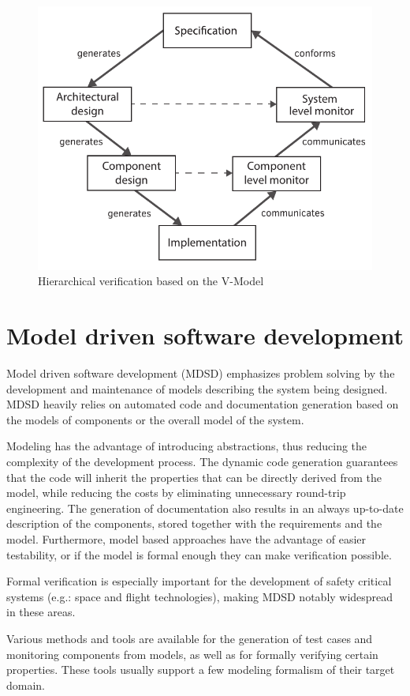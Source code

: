 \begin{figure}[h]
	\centering
	\includegraphics[width=0.8\linewidth]{include/figures/chapter_1/rv_vmodel}
	\caption{Hierarchical verification based on the V-Model}
	\label{fig:intro:rvmodel}
\end{figure}

\section{Model driven software development}

Model driven software development (MDSD) emphasizes problem solving by the development and maintenance of models describing the system being designed. MDSD heavily relies on automated code and documentation generation based on the models of components or the overall model of the system. 

Modeling has the advantage of introducing abstractions, thus reducing the complexity of the development process. The dynamic code generation guarantees that the code will inherit the properties that can be directly derived from the model, while reducing the costs by eliminating unnecessary round-trip engineering. The generation of documentation also results in an always up-to-date description of the components, stored together with the requirements and the model. Furthermore, model based approaches have the advantage of easier testability, or if the model is formal enough they can make verification possible.

Formal verification is especially important for the development of safety critical systems (e.g.: space and flight technologies), making MDSD notably widespread in these areas.

Various methods and tools are available for the generation of test cases and monitoring components from models, as well as for formally verifying certain properties. These tools usually support a few modeling formalism of their target domain.

